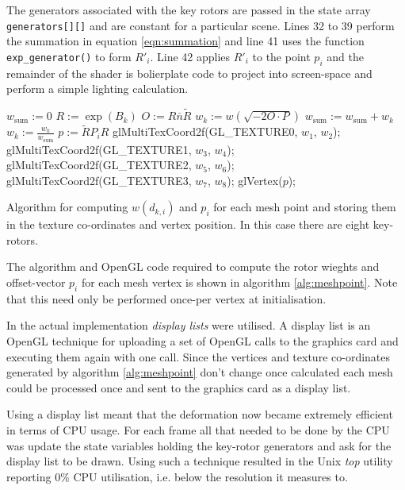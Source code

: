 The generators associated with the key rotors are passed in the state array {\tt generators[][]}
and are constant for a particular scene. Lines 32 to 39 perform the summation in 
equation \ref{eqn:summation} and line 41 uses the function {\tt exp\_generator()} to 
form $R'_i$. Line 42 applies $R'_i$ to the point $p_i$ and the remainder of the shader
is bolierplate code to project into screen-space and perform a simple lighting calculation.

\begin{fancyalg}
\begin{algorithmic}[1]
\STATE $w_{\mathrm{sum}} := 0$
\STATE $R := \exp(B_k)$
\STATE $O := R\bar{n}\tilde{R}$
\STATE $w_k := w(\sqrt{-2 O \cdot P})$
\STATE $w_{\mathrm{sum}} := w_{\mathrm{sum}} + w_k$
\ENDFOR
{}
\STATE $w_k := \frac{w_k}{w_{\mathrm{sum}}}$
\ENDFOR
\STATE $p := \tilde{R}P_iR$
\STATE glMultiTexCoord2f(GL\_TEXTURE0, $w_1$, $w_2$);
\STATE glMultiTexCoord2f(GL\_TEXTURE1, $w_3$, $w_4$); 
\STATE glMultiTexCoord2f(GL\_TEXTURE2, $w_5$, $w_6$);
\STATE glMultiTexCoord2f(GL\_TEXTURE3, $w_7$, $w_8$);
\STATE glVertex($p$);
\end{algorithmic}
\caption{\label{alg:meshpoint}Algorithm for computing $w(d_{k,i})$ and $p_i$ for 
  each mesh point and storing them in the texture co-ordinates and vertex position.
  In this case there are eight key-rotors.}
\end{fancyalg}

The algorithm and OpenGL code required to compute the rotor wieghts and offset-vector
$p_i$ for each mesh vertex is shown in algorithm \ref{alg:meshpoint}. Note that this
need only be performed once-per vertex at initialisation.

In the actual implementation \emph{display lists} were utilised. A display list 
is an OpenGL technique for uploading a set of OpenGL calls to the graphics card
and executing them again with one call. Since the vertices and texture co-ordinates
generated by algorithm \ref{alg:meshpoint} don't change once calculated each mesh could
be processed once and sent to the graphics card as a display list.

Using a display list meant that the deformation now became extremely efficient in
terms of CPU usage. For each frame all that needed to be done by the CPU was update the
state variables holding the key-rotor generators and ask for the display list to be drawn.
Using such a technique resulted in the Unix \emph{top} utility reporting 0\% CPU utilisation,
i.e. below the resolution it measures to.

